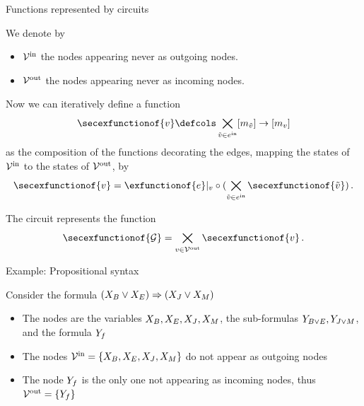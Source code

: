 \documentclass{beamer}
\begin{document}
    \begin{frame}{Functions represented by circuits}

        We denote by
        \begin{itemize}
            \item $\mathcal{V}^{\mathrm{in}}$ the nodes appearing never as outgoing nodes.
            \item $\mathcal{V}^{\mathrm{out}}$ the nodes appearing never as incoming nodes.
        \end{itemize}

        Now we can iteratively define a function
        \begin{align*}
            \secexfunctionof{\node} \defcols \bigtimes_{\secnode\in\incomingnodes}[\catdimof{\secnode}] \rightarrow [\catdimof{\node}]
        \end{align*}
        as the composition of the functions decorating the edges, mapping the states of $\mathcal{V}^{\mathrm{in}}$ to the states of $\mathcal{V}^{\mathrm{out}}$, by
        \begin{align*}
            \secexfunctionof{\node}  = \exfunctionof{\edge}|_{\node} \circ (\bigtimes_{\secnode\in\incomingnodes} \secexfunctionof{\secnode}) \, .
        \end{align*}


        The circuit represents the function
        \begin{align*}
            \secexfunctionof{\graph}
            = \bigtimes_{\node\in\outnodes} \secexfunctionof{\node} \, .
        \end{align*}
    \end{frame}

    \begin{frame}{Example: Propositional syntax}

        Consider the formula $(X_{B}\lor X_{E})\Rightarrow (X_{J}\lor X_{M})$
        \begin{itemize}
            \item The nodes are the variables $X_{B},X_{E},X_{J},X_{M}$, the sub-formulas $Y_{B\lor E},Y_{J\lor M}$, and the formula $Y_{f}$
            \item The nodes $\mathcal{V}^{\mathrm{in}}=\{X_{B},X_{E},X_{J},X_{M}\}$ do not appear as outgoing nodes
            \item The node $Y_{f}$ is the only one not appearing as incoming nodes, thus $\mathcal{V}^{\mathrm{out}}=\{Y_{f}\}$
        \end{itemize}
        
    \end{frame}
\end{document}
